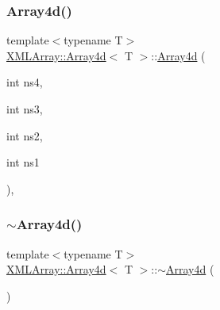 \subsubsection{\texorpdfstring{Array4d()}{Array4d()}\hspace{0.1cm}{\footnotesize\ttfamily [8/9]}}
{\footnotesize\ttfamily template$<$typename T$>$ \\
\mbox{\hyperlink{classXMLArray_1_1Array4d}{X\+M\+L\+Array\+::\+Array4d}}$<$ T $>$\+::\mbox{\hyperlink{classXMLArray_1_1Array4d}{Array4d}} (\begin{DoxyParamCaption}\item[{int}]{ns4,  }\item[{int}]{ns3,  }\item[{int}]{ns2,  }\item[{int}]{ns1 }\end{DoxyParamCaption})\hspace{0.3cm}{\ttfamily [inline]}, {\ttfamily [explicit]}}

\mbox{\label{classXMLArray_1_1Array4d_a80523fcfbd3cf8493a2f5928dd9a3f15}} 
\subsubsection{\texorpdfstring{$\sim$Array4d()}{~Array4d()}\hspace{0.1cm}{\footnotesize\ttfamily [3/3]}}
{\footnotesize\ttfamily template$<$typename T$>$ \\
\mbox{\hyperlink{classXMLArray_1_1Array4d}{X\+M\+L\+Array\+::\+Array4d}}$<$ T $>$\+::$\sim$\mbox{\hyperlink{classXMLArray_1_1Array4d}{Array4d}} (\begin{DoxyParamCaption}{ }\end{DoxyParamCaption})\hspace{0.3cm}{\ttfamily [inline]}}

\mbox{\label{classXMLArray_1_1Array4d_aa288af6ef6ecbd04554a984ce1514c01}} 
